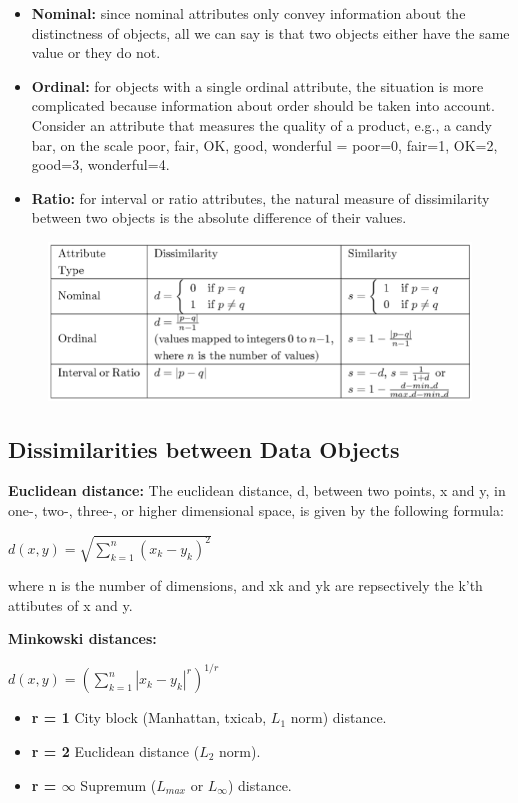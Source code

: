 		\begin{itemize}
			\item{\bf Nominal:} since nominal attributes only convey information about
			the distinctness of objects, all we can say is that two objects either have the
			same value or they do not.
			\item{\bf Ordinal:} for objects with a single ordinal attribute, the situation
			is more complicated because information about order should be taken into account.
			Consider an attribute that measures the quality of a product, e.g., a candy bar, 
			on the scale {poor, fair, OK, good, wonderful} = {poor=0, fair=1, OK=2, good=3, 
			wonderful=4}.
			\item{\bf Ratio:} for interval or ratio attributes, the natural measure of dissimilarity
			between two objects is the absolute difference of their values.
		\end{itemize}

		\begin{figure}[H]
			\includegraphics[width=\textwidth]{pics/simpleAttribute.png}
		\end{figure}

	
	\subsection{Dissimilarities between Data Objects}

	{\bf Euclidean distance:} The euclidean distance, d, between two points, x and y,
	in one-, two-, three-, or higher dimensional space, is given by the following formula:

		$d(x,y) = \sqrt{\sum_{k=1}^{n} (x_k - y_k)^{2}}$
	

	where n is the number of dimensions, and xk and yk are repsectively the k'th attibutes
	of x and y. 

	\clearpage
	{\bf Minkowski distances:}


		$d(x,y) = \left(\sum_{k=1}^{n} |x_k - y_k|^{r}\right) ^{1/r}$

	\begin{itemize}
		\item {\bf r = 1} City block (Manhattan, txicab, $L_{1}$ norm) distance.
		\item {\bf r = 2} Euclidean distance ($L_{2}$ norm).
		\item {\bf r = $\infty$} Supremum ($L_{max}$ or $L_{\infty}$) distance.
	\end{itemize}

